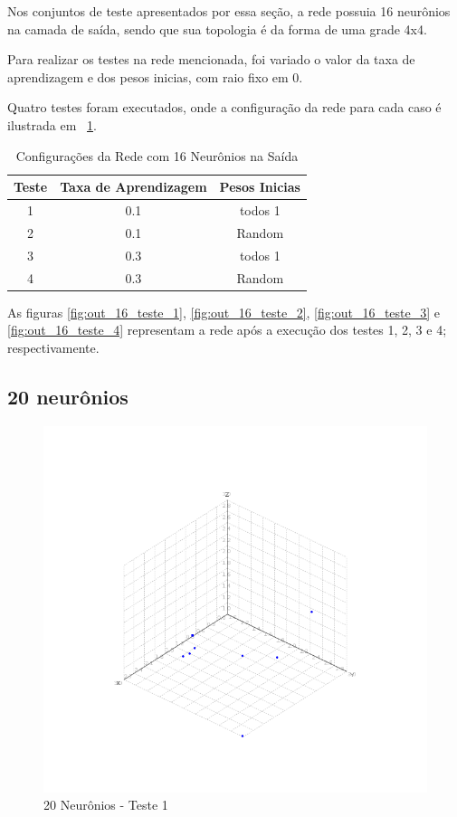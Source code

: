 Nos conjuntos de teste apresentados por essa seção, a rede possuia 16 neurônios na camada de saída, sendo que sua topologia é da forma de uma grade 4x4.

Para realizar os testes na rede mencionada, foi variado o valor da taxa de aprendizagem e dos pesos inicias, com raio fixo em 0.

Quatro testes foram executados, onde a configuração da rede para cada caso é ilustrada em ~\ref{table:dados_16}.
\begin{table}[ht]
\caption{Configurações da Rede com 16 Neurônios na Saída}
\centering
\begin{tabular}{|c|c|c|}  \hline
   Teste 	& Taxa de Aprendizagem 	& Pesos Inicias 	\\ \hline
   1 		& 0.1 				 	& todos 1 			\\ \hline
   2 		& 0.1 				 	& Random 			\\ \hline
   3 		& 0.3 				 	& todos 1 			\\ \hline
   4 		& 0.3 				 	& Random 			\\ \hline
\end{tabular}
\label{table:dados_16}
\end{table}

As figuras \ref{fig:out_16_teste_1}, \ref{fig:out_16_teste_2}, \ref{fig:out_16_teste_3} e \ref{fig:out_16_teste_4} representam a rede após a execução dos testes 1, 2, 3 e 4; respectivamente.


\subsection{20 neurônios} %
\label{sub:20_neuronios}

\begin{figure}[ht!]
	\centering
	\includegraphics[scale=0.4]{./imgs/fig:out_20_teste_1}
	\caption{20 Neurônios - Teste 1}
	\label{fig:out_20_teste_1}
\end{figure}

